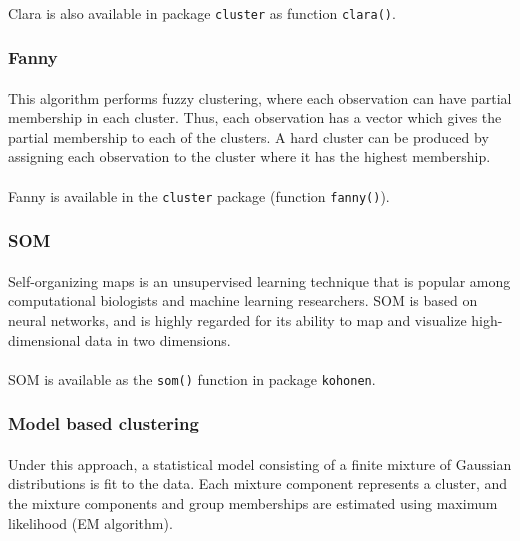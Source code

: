 \documentclass[10pt]{article}\usepackage[]{graphicx}\usepackage[]{color}
\begin{document}
\paragraph{}
Clara is
also available in package \texttt{cluster} as function \texttt{clara()}.


\subsubsection{Fanny}
\paragraph{}
This algorithm performs fuzzy clustering, where each observation can have
partial membership in each cluster. Thus,
each observation has a vector which gives the partial membership to each of
the clusters. A hard cluster can be produced by assigning each observation
to the cluster where it has the highest membership. 
\paragraph{}
Fanny is available in the \texttt{cluster} package (function \texttt{fanny()}).


\subsubsection{SOM}
\paragraph{}
Self-organizing maps is an unsupervised learning technique
that is popular among computational biologists and machine learning researchers.
SOM is based on neural networks, and is highly regarded for its
ability to map and visualize high-dimensional data in two dimensions.
\paragraph{}
SOM is available as the \texttt{som()} function in package \texttt{kohonen}.


\subsubsection{Model based clustering}
\paragraph{}
Under this approach, a statistical model consisting of a finite mixture of
Gaussian distributions is fit to the data. Each
mixture component represents a cluster, and the mixture components and
group memberships are estimated using maximum likelihood (EM algorithm).
\end{document}
